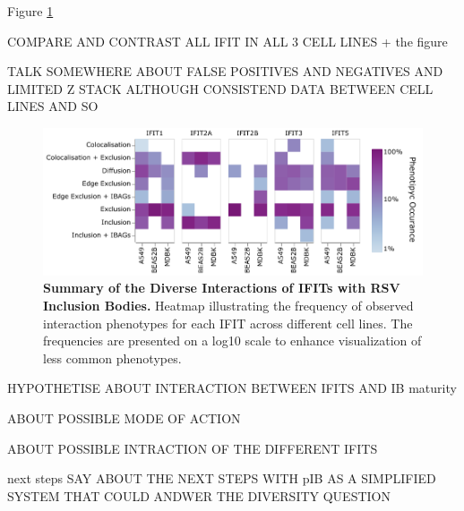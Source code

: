 Figure \ref{fig:Summary of the Diverse Interactions of IFITs with RSV Inclusion Bodies}

COMPARE AND CONTRAST ALL IFIT IN ALL 3 CELL LINES + the figure

TALK SOMEWHERE ABOUT FALSE POSITIVES AND NEGATIVES AND LIMITED Z STACK 
ALTHOUGH CONSISTEND DATA BETWEEN CELL LINES AND SO

\begin{figure}
    \centering
    \includegraphics[width=1\linewidth]{08. Chapter 3/Figs/heatmap_infection.pdf}
    \caption[Summary of the Diverse Interactions of IFITs with RSV Inclusion Bodies.]{\textbf{Summary of the Diverse Interactions of IFITs with RSV Inclusion Bodies.} Heatmap illustrating the frequency of observed interaction phenotypes for each IFIT across different cell lines. The frequencies are presented on a log10 scale to enhance visualization of less common phenotypes.}
    \label{fig:Summary of the Diverse Interactions of IFITs with RSV Inclusion Bodies}
\end{figure}


HYPOTHETISE ABOUT INTERACTION BETWEEN IFITS AND IB maturity

ABOUT POSSIBLE MODE OF ACTION

ABOUT POSSIBLE INTRACTION OF THE DIFFERENT IFITS


next steps
SAY ABOUT THE NEXT STEPS WITH pIB AS A SIMPLIFIED SYSTEM THAT COULD ANDWER THE DIVERSITY QUESTION




